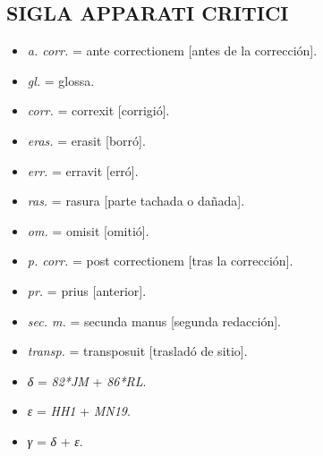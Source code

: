 \documentclass[11pt,a4paper,twoside]{article}
\begin{document}
\subsection*{\fontsize{9.5}{11.96}\selectfont SIGLA APPARATI CRITICI}

\begin{itemize}[label=]%
\item \textit{a. corr.} = ante correctionem [antes de la corrección].
\item \textit{gl.} = glossa.
\item \textit{corr.} = correxit [corrigió].
\item \textit{eras.} = erasit [borró].
\item \textit{err.} = erravit [erró].
\item \textit{ras.} = rasura [parte tachada o dañada].
\item \textit{om.} = omisit [omitió].
\item \textit{p. corr.} = post correctionem [tras la corrección].
\item \textit{pr.} = prius [anterior].
\item \textit{sec. m.} = secunda manus [segunda redacción].
\item \textit{transp.} = transposuit [trasladó de sitio].
\item \textit{δ} = \textit{82*JM} + \textit{86*RL}.
\item \textit{ε} = \textit{HH1} + \textit{MN19}.
\item \textit{γ} = \textit{δ} + \textit{ε}.%
\end{itemize} 
\newpage
\end{document}
